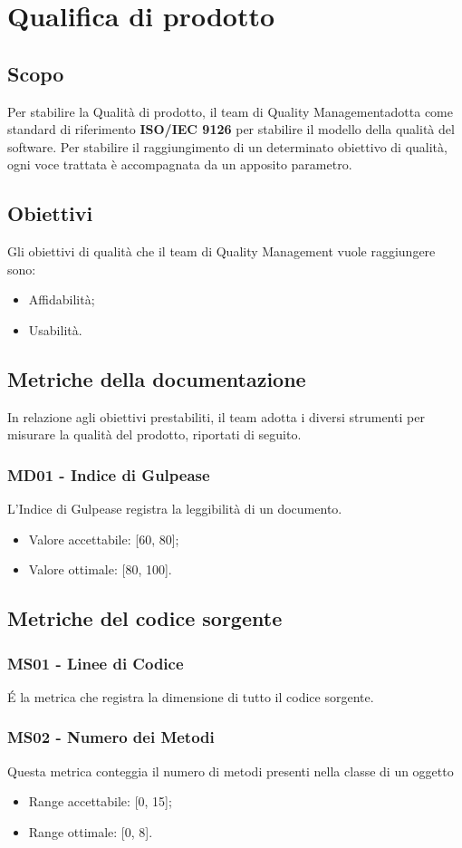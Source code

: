 \section{Qualifica di prodotto}
\subsection{Scopo}
Per stabilire la Qualità di prodotto, il team di Quality Management\glo adotta come standard di riferimento \textbf{ISO/IEC 9126} per stabilire il modello della qualità del software. Per stabilire il raggiungimento di un determinato obiettivo di qualità, ogni voce trattata è accompagnata da un apposito parametro.
\subsection{Obiettivi}
Gli obiettivi di qualità che il team di Quality Management vuole raggiungere sono:
\begin{itemize}
\item Affidabilità;
\item Usabilità.
\end{itemize}
\subsection{Metriche della documentazione}
In relazione agli obiettivi prestabiliti, il team adotta i diversi strumenti per misurare la qualità del prodotto, riportati di seguito.
\subsubsection{MD01 - Indice di Gulpease}
L'Indice di Gulpease registra la leggibilità di un documento.
\begin{itemize}
\item Valore accettabile: [60, 80];
\item Valore ottimale: [80, 100].
\end{itemize}
\subsection{Metriche del codice sorgente}
\subsubsection{MS01 - Linee di Codice}
\'E la metrica che registra la dimensione di tutto il codice sorgente.
\subsubsection{MS02 - Numero dei Metodi}
Questa metrica conteggia il numero di metodi presenti nella classe di un oggetto
\begin{itemize}
\item Range accettabile: [0, 15];
\item Range ottimale: [0, 8].
\end{itemize}
